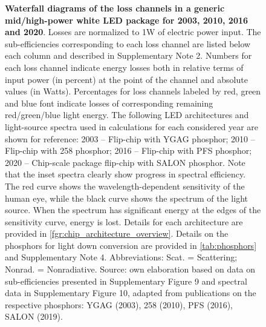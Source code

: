 \documentclass[parskip=full]{article}
\begin{document}
\begin{figure}[H]
 \caption{\textbf{Waterfall diagrams of the loss channels in a generic mid/high-power white LED package for 2003, 2010, 2016 and 2020}. Losses are normalized to 1W of electric power input. The sub-efficiencies corresponding to each loss channel are listed below each column and described in Supplementary Note 2. Numbers for each loss channel indicate energy losses both in relative terms of input power (in percent) at the point of the channel and absolute values (in Watts). Percentages for loss channels labeled by red, green and blue font indicate losses of corresponding remaining red/green/blue light energy. The following LED architectures and light-source spectra used in calculations for each considered year are shown for reference: 2003 – Flip-chip with YGAG phosphor; 2010 – Flip-chip with 258 phosphor; 2016 – Flip-chip with PFS phosphor; 2020 – Chip-scale package flip-chip with SALON phosphor. Note that the inset spectra clearly show progress in spectral efficiency. The red curve shows the wavelength-dependent sensitivity of the human eye, while the black curve shows the spectrum of the light source. When the spectrum has significant energy at the edges of the sensitivity curve, energy is lost. Details for each architecture are provided in \cref{fgr:chip_architecture_overview}.  Details on the phosphors for light down conversion are provided in \cref{tab:phosphors} and Supplementary Note 4. Abbreviations: Scat. = Scattering; Nonrad. = Nonradiative. Source: own elaboration based on data on sub-efficiencies presented in Supplementary Figure 9 and spectral data in Supplementary Figure 10, adapted from publications on the respective phosphors: YGAG (2003)\cite{Mueller2002}, 258 (2010)\cite{MuellerMach2005}, PFS (2016)\cite{Murphy2015}, SALON (2019)\cite{Hoerder2019}.}
 \label{fgr:waterfall}
\end{figure}
\end{document}
